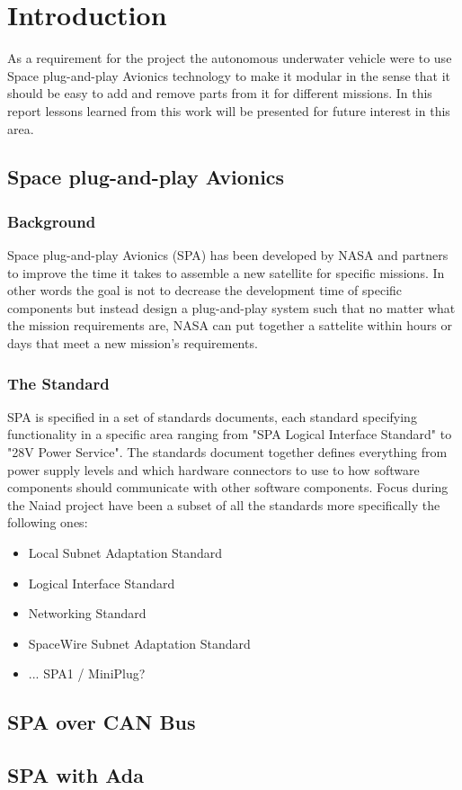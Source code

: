 \section{Introduction}\label{sec:introduction}
As a requirement for the project the autonomous underwater vehicle were to use
Space plug-and-play Avionics technology to make it modular in the sense that
it should be easy to add and remove parts from it for different missions. In
this report lessons learned from this work will be presented for future
interest in this area.

\subsection{Space plug-and-play Avionics}
\subsubsection{Background}
Space plug-and-play Avionics (SPA) has been developed by NASA and partners to
improve the time it takes to assemble a new satellite for specific missions.
In other words the goal is not to decrease the development time of specific
components but instead design a plug-and-play system such that no matter what
the mission requirements are, NASA can put together a sattelite within hours or
days that meet a new mission's requirements.

\subsubsection{The Standard}
SPA is specified in a set of standards documents, each standard specifying
functionality in a specific area ranging from "SPA Logical Interface Standard"
to "28V Power Service". The standards document together defines everything from power
supply levels and which hardware connectors to use to how software components should
communicate with other software components. Focus during the Naiad project have
been a subset of all the standards more specifically the following ones:

\begin{itemize}
  \item Local Subnet Adaptation Standard
  \item Logical Interface Standard
  \item Networking Standard
  \item SpaceWire Subnet Adaptation Standard
  \item ... SPA1 / MiniPlug?
\end{itemize}

\subsection{SPA over CAN Bus}

\subsection{SPA with Ada}
